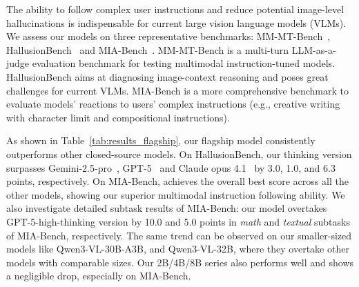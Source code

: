The ability to follow complex user instructions and reduce potential image-level hallucinations is indispensable for current large vision language models (VLMs).
We assess our models on three representative benchmarks: MM-MT-Bench~\citep{mm_mt_bench}, HallusionBench~\citep{hallusion_bench} and MIA-Bench~\citep{mia-bench}. MM-MT-Bench is a multi-turn LLM-as-a-judge evaluation benchmark for testing multimodal instruction-tuned models. HallusionBench aims at diagnosing image-context reasoning and poses great challenges for current VLMs. MIA-Bench is a more comprehensive benchmark to evaluate models' reactions to users' complex instructions (e.g., creative writing with character limit and compositional instructions). 

As shown in Table~\ref{tab:results_flagship}, our flagship \ModelBig model consistently outperforms other closed-source models. On HallusionBench, our thinking version surpasses Gemini-2.5-pro~\citep{comanici2025gemini}, GPT-5~\citep{gpt5} and Claude opus 4.1~\citep{opus4_1} by 3.0, 1.0, and 6.3 points, respectively. On MIA-Bench, \ThinkBig achieves the overall best score across all the other models, showing our superior multimodal instruction following ability. We also investigate detailed subtask results of MIA-Bench: our model overtakes GPT-5-high-thinking version by 10.0 and 5.0 points in \textit{math} and \textit{textual} subtasks of MIA-Bench, respectively. The same trend can be observed on our smaller-sized models like Qwen3-VL-30B-A3B, and Qwen3-VL-32B, where they overtake other models with comparable sizes. Our 2B/4B/8B series also performs well and shows a negligible drop, especially on MIA-Bench. 

